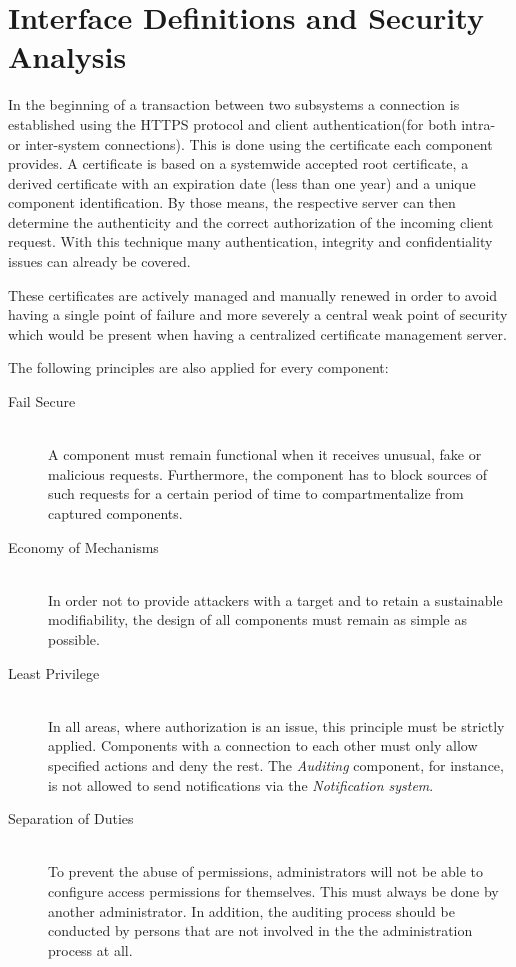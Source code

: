 \documentclass[12pt,a4paper,titlepage,oneside]{scrartcl}
\begin{document}
\section{Interface Definitions and Security Analysis}
In the beginning of a transaction between two subsystems a connection  is established using the HTTPS protocol and client authentication(for both intra- or inter-system connections). This is done using the certificate each component provides. A certificate is based on a systemwide accepted root certificate, a derived certificate with an expiration date (less than one year) and a unique component identification. By those means, the respective server can then determine the authenticity and the correct authorization of the incoming client request. With this technique many authentication, integrity and confidentiality issues can already be covered.

These certificates are actively managed and manually renewed in order to avoid having a single point of failure and more severely a central weak point of security which would be present when having a centralized certificate management server.

The following principles are also applied for every component:

\begin{description}
  \item[Fail Secure] \hfill \\
  A component must remain functional when it receives unusual, fake or malicious requests. Furthermore, the component has to block sources of such requests for a certain period of time to compartmentalize from captured components.
  \item[Economy of Mechanisms] \hfill \\
  In order not to provide attackers with a target and to retain a sustainable modifiability, the design of all components must remain as simple as possible.
  \item[Least Privilege] \hfill \\
  In all areas, where authorization is an issue, this principle must be strictly applied. Components with a connection to each other must only allow specified actions and deny the rest. The \emph{Auditing} component, for instance, is not allowed to send notifications via the \emph{Notification system}.
  \item[Separation of Duties] \hfill \\
  To prevent the abuse of permissions, administrators will not be able to configure access permissions for themselves. This must always be done by another administrator. In addition, the auditing process should be conducted by persons that are not involved in the the administration process at all.
\end{description}
\end{document}
